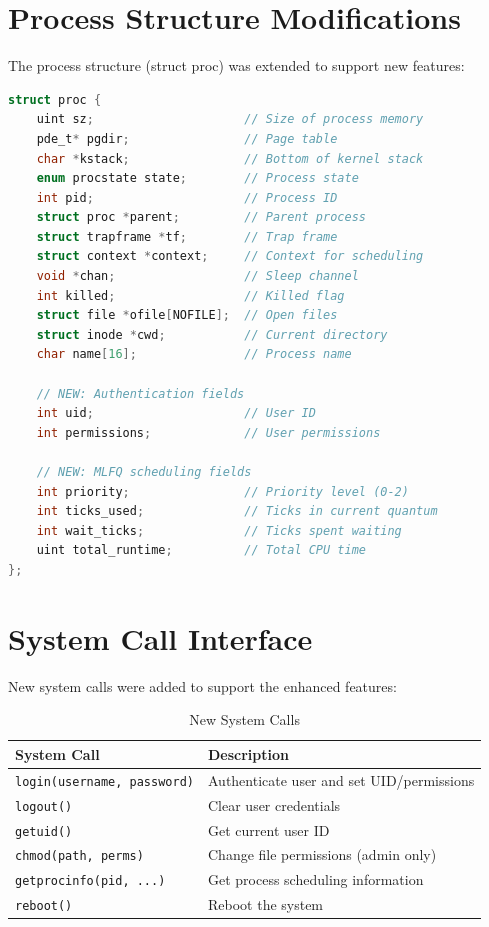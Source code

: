 \documentclass[a4paper,12pt]{report}
\begin{document}
\section{Process Structure Modifications}

The process structure (struct proc) was extended to support new features:

\begin{lstlisting}[language=C, caption=Enhanced Process Structure (proc.h)]
struct proc {
    uint sz;                     // Size of process memory
    pde_t* pgdir;                // Page table
    char *kstack;                // Bottom of kernel stack
    enum procstate state;        // Process state
    int pid;                     // Process ID
    struct proc *parent;         // Parent process
    struct trapframe *tf;        // Trap frame
    struct context *context;     // Context for scheduling
    void *chan;                  // Sleep channel
    int killed;                  // Killed flag
    struct file *ofile[NOFILE];  // Open files
    struct inode *cwd;           // Current directory
    char name[16];               // Process name
    
    // NEW: Authentication fields
    int uid;                     // User ID
    int permissions;             // User permissions
    
    // NEW: MLFQ scheduling fields
    int priority;                // Priority level (0-2)
    int ticks_used;              // Ticks in current quantum
    int wait_ticks;              // Ticks spent waiting
    uint total_runtime;          // Total CPU time
};
\end{lstlisting}

\section{System Call Interface}

New system calls were added to support the enhanced features:

\begin{table}[H]
\centering
\begin{tabular}{|l|p{8cm}|}
\hline
\textbf{System Call} & \textbf{Description} \\
\hline
\texttt{login(username, password)} & Authenticate user and set UID/permissions \\
\texttt{logout()} & Clear user credentials \\
\texttt{getuid()} & Get current user ID \\
\texttt{chmod(path, perms)} & Change file permissions (admin only) \\
\texttt{getprocinfo(pid, ...)} & Get process scheduling information \\
\texttt{reboot()} & Reboot the system \\
\hline
\end{tabular}
\caption{New System Calls}
\label{tab:syscalls}
\end{table}
\end{document}
